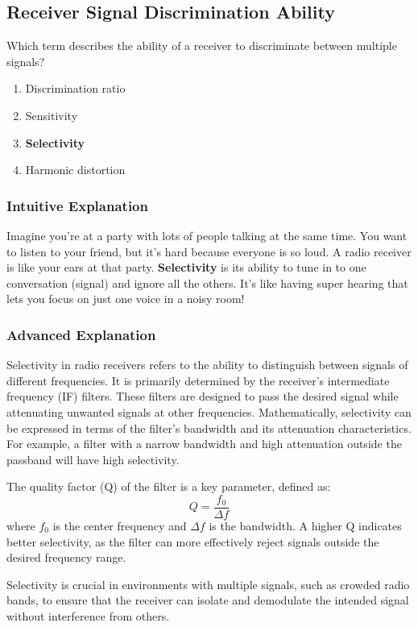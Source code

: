 \subsection{Receiver Signal Discrimination Ability}
\label{T7A04}

\begin{tcolorbox}[colback=gray!10!white,colframe=black!75!black,title=T7A04]
Which term describes the ability of a receiver to discriminate between multiple signals?
\begin{enumerate}[label=\Alph*)]
    \item Discrimination ratio
    \item Sensitivity
    \item \textbf{Selectivity}
    \item Harmonic distortion
\end{enumerate}
\end{tcolorbox}

\subsubsection{Intuitive Explanation}
Imagine you're at a party with lots of people talking at the same time. You want to listen to your friend, but it's hard because everyone is so loud. A radio receiver is like your ears at that party. \textbf{Selectivity} is its ability to tune in to one conversation (signal) and ignore all the others. It’s like having super hearing that lets you focus on just one voice in a noisy room!

\subsubsection{Advanced Explanation}
Selectivity in radio receivers refers to the ability to distinguish between signals of different frequencies. It is primarily determined by the receiver's intermediate frequency (IF) filters. These filters are designed to pass the desired signal while attenuating unwanted signals at other frequencies. Mathematically, selectivity can be expressed in terms of the filter's bandwidth and its attenuation characteristics. For example, a filter with a narrow bandwidth and high attenuation outside the passband will have high selectivity. 

The quality factor (Q) of the filter is a key parameter, defined as:
\[
Q = \frac{f_0}{\Delta f}
\]
where \( f_0 \) is the center frequency and \( \Delta f \) is the bandwidth. A higher Q indicates better selectivity, as the filter can more effectively reject signals outside the desired frequency range.

Selectivity is crucial in environments with multiple signals, such as crowded radio bands, to ensure that the receiver can isolate and demodulate the intended signal without interference from others.

